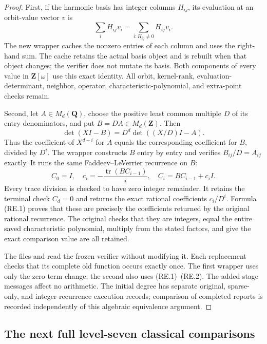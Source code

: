 \documentclass[11pt,a4paper]{article}
\theoremstyle{definition}
\begin{document}
\begin{proof}
First, if the harmonic basis has integer columns \(H_{ij}\), its evaluation
at an orbit-value vector \(v\) is
\[
 \sum_i H_{ij}v_i
   =\sum_{i:H_{ij}\ne0}H_{ij}v_i.
\]
The new wrapper caches the nonzero entries of each column and uses the
right-hand sum. The cache retains the actual basis object and is rebuilt
when that object changes; the verifier does not mutate its basis.
Both components of every value in \(\mathbf Z[\omega]\) use this exact
identity. All orbit, kernel-rank, evaluation-determinant, neighbor,
operator, characteristic-polynomial, and extra-point checks remain.

Second, let \(A\in M_d(\mathbf Q)\), choose the positive least common
multiple \(D\) of its entry denominators, and put \(B=DA\in M_d(\mathbf Z)\).
Then
\[
 \det(XI-B)=D^d\det((X/D)I-A).
 \tag{RE.1}
\]
Thus the coefficient of \(X^{d-i}\) for \(A\) equals the corresponding
coefficient for \(B\), divided by \(D^i\). The wrapper constructs \(B\)
entry by entry and verifies \(B_{ij}/D=A_{ij}\) exactly. It runs the
same Faddeev--LeVerrier recurrence on \(B\):
\[
 C_0=I,
 \quad c_i=-\frac{\operatorname{tr}(BC_{i-1})}{i},
 \quad C_i=BC_{i-1}+c_iI.
 \tag{RE.2}
\]
Every trace division is checked to have zero integer remainder.
It retains the terminal check \(C_d=0\) and returns the exact rational
coefficients \(c_i/D^i\). Formula (RE.1) proves that these are precisely
the coefficients returned by the original rational recurrence. The
original checks that they are integers, equal the entire saved
characteristic polynomial, multiply from the stated factors, and give
the exact comparison value are all retained.

The files
and 
read the frozen verifier without modifying it. Each replacement checks
that its complete old function occurs exactly once. The first wrapper
uses only the zero-term change; the second also uses (RE.1)--(RE.2).
The added stage messages affect no arithmetic. The initial degree has
separate original, sparse-only, and integer-recurrence execution records;
comparison of completed reports is recorded independently of this
algebraic equivalence argument.
\end{proof}

\subsection{The next full level-seven classical comparisons}
\label{sec:gl2-minus7-higher4}
\end{document}
